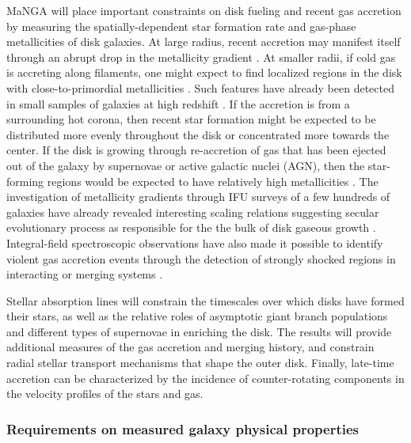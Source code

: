 \documentclass[preprint,11pt]{aastex}
\begin{document}
MaNGA will place important constraints on disk fueling and recent gas
accretion by measuring the spatially-dependent star formation rate and
gas-phase metallicities of disk galaxies.  At large radius, recent
accretion may manifest itself through an abrupt drop in the
metallicity gradient \citep{moran12}.  At smaller radii, if cold gas
is accreting along filaments, one might expect to find localized
regions in the disk with close-to-primordial metallicities
\citep[e.g.][]{spitoni11, mott13}. Such features have already been
detected in small samples of galaxies at high redshift
\citep{cresci10,troncoso13}. If the accretion is from a surrounding
hot corona, then recent star formation might be expected to be
distributed more evenly throughout the disk or concentrated more
towards the center.  If the disk is growing through re-accretion of
gas that has been ejected out of the galaxy by supernovae or active
galactic nuclei (AGN), then the star-forming regions would be expected
to have relatively high metallicities
\citep[e.g.][]{bresolin12,spitoni13}.
% 
The investigation of metallicity gradients through IFU surveys of a 
few hundreds of galaxies have already revealed interesting scaling 
relations suggesting secular evolutionary process as responsible for 
the the bulk of disk gaseous growth
\citep{rosales10,rosales11,sanchez13}. Integral-field spectroscopic 
observations have also made it possible to identify violent gas 
accretion events through the detection of strongly shocked regions 
in interacting or merging systems \citep{rich13,monreal10}.

Stellar absorption lines will constrain the timescales over which
disks have formed their stars, as well as the relative roles of
asymptotic giant branch populations and different types of supernovae
in enriching the disk. The results will provide additional measures of
the gas accretion and merging history, and constrain radial stellar transport
mechanisms that shape the outer disk. %
Finally, late-time accretion can be characterized by the
incidence of counter-rotating components in the velocity profiles of
the stars and gas.

\subsubsection{Requirements on measured galaxy physical properties}
\end{document}
